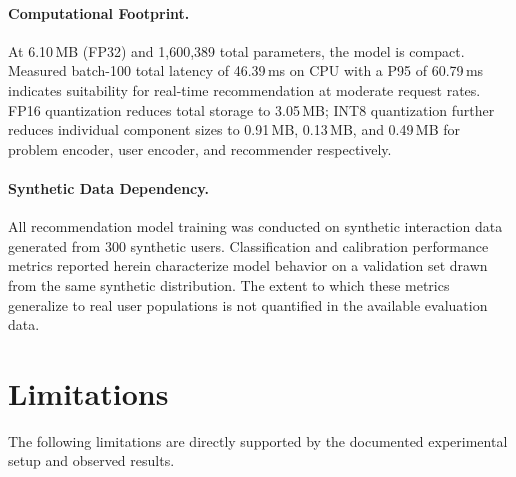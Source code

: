 \documentclass[12pt]{article}
\begin{document}
\paragraph{Computational Footprint.}
At 6.10\,MB (FP32) and 1,600,389 total parameters, the model is compact. Measured batch-100 total latency of 46.39\,ms on CPU with a P95 of 60.79\,ms indicates suitability for real-time recommendation at moderate request rates. FP16 quantization reduces total storage to 3.05\,MB; INT8 quantization further reduces individual component sizes to 0.91\,MB, 0.13\,MB, and 0.49\,MB for problem encoder, user encoder, and recommender respectively.

\paragraph{Synthetic Data Dependency.}
All recommendation model training was conducted on synthetic interaction data generated from 300 synthetic users. Classification and calibration performance metrics reported herein characterize model behavior on a validation set drawn from the same synthetic distribution. The extent to which these metrics generalize to real user populations is not quantified in the available evaluation data.

\section{Limitations}

The following limitations are directly supported by the documented experimental setup and observed results.
\end{document}
